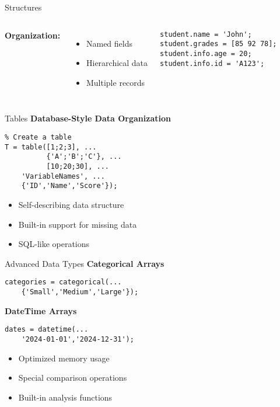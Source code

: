 \documentclass[10pt]{beamer}
\theoremstyle{plain}%
\theoremstyle{definition}
\theoremstyle{remark}
\begin{document}
\begin{frame}[fragile]{Structures}
    \begin{columns}
        \textbf{Organization:}
        \begin{itemize}
            \item Named fields
            \item Hierarchical data
            \item Multiple records
        \end{itemize}
        
        \begin{lstlisting}
student.name = 'John';
student.grades = [85 92 78];
student.info.age = 20;
student.info.id = 'A123';
        \end{lstlisting}
    \end{columns}
\end{frame}

\begin{frame}[fragile]{Tables}
    \textbf{Database-Style Data Organization}
    \begin{lstlisting}
% Create a table
T = table([1;2;3], ...
          {'A';'B';'C'}, ...
          [10;20;30], ...
    'VariableNames', ...
    {'ID','Name','Score'});
    \end{lstlisting}
    \begin{itemize}
        \item Self-describing data structure
        \item Built-in support for missing data
        \item SQL-like operations
    \end{itemize}
\end{frame}

\begin{frame}[fragile]{Advanced Data Types}
    \textbf{Categorical Arrays}
    \begin{lstlisting}
categories = categorical(...
    {'Small','Medium','Large'});
    \end{lstlisting}
    
    \textbf{DateTime Arrays}
    \begin{lstlisting}
dates = datetime(...
    '2024-01-01','2024-12-31');
    \end{lstlisting}
    \begin{itemize}
        \item Optimized memory usage
        \item Special comparison operations
        \item Built-in analysis functions
    \end{itemize}
\end{frame}
\end{document}
